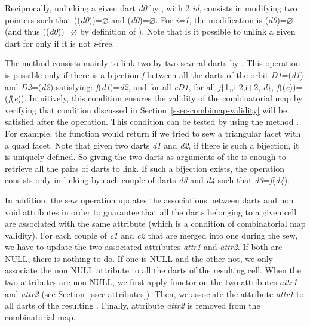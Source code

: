 Reciprocally, unlinking a given dart \emph{d0} by \betai{}, with 2\myleq{}
\emph{i}\myleq{}\emph{d}, consists in modifying two \betai{} pointers
such that \betai{}(\betai{}(\emph{d0}))=$\varnothing$ and
\betai{}(\emph{d0})=$\varnothing$.  For \emph{i=1}, the modification is
\betaun{}(\emph{d0})=$\varnothing$ (and thus
\betazero{}(\betaun{}(\emph{d0}))=$\varnothing$ by definition of \betazero{}).  Note
that is it possible to unlink a given dart for \betai{} only if it is
not \emph{i}-free.

The  method consists mainly to link two by two
several darts by \betai{}. This operation is possible only if there is
a bijection \emph{f} between all the darts of the orbit
\emph{D1}=\orbit{\betaun{},\myldots{},\betaimdeux{},\betaipdeux{},\myldots{},\betad{}}(\emph{d1}) and
\emph{D2}=\orbit{\betaun{},\myldots{},\betaimdeux{},\betaipdeux{},\myldots{},\betad{}}(\emph{d2})
satisfying: \emph{f}(\emph{d1})=\emph{d2}, and for all \emph{e}\myin{}\emph{D1}, 
for all \emph{j}\myin{}\{1,\myldots{},i-2,i+2,\myldots{},\emph{d}\},
\emph{f}(\betaj{}(\emph{e}))=\betajinv{}(\emph{f}(\emph{e})).  Intuitively, this condition
ensures the validity of the combinatorial map by verifying that
condition discussed in Section~\ref{ssec-combimap-validity} will be
satisfied after the operation.  This condition can be tested by using the method
. For example, the function
 would return  if we tried to sew a
triangular facet with a quad facet. Note that given two darts \emph{d1}
and \emph{d2}, if there is such a bijection, it is uniquely defined. So giving
the two darts as arguments of the  is enough to retrieve
all the pairs of darts to link.
If such a bijection exists, the  operation
consists only in linking by \betai{} each couple of darts \emph{d3} and
\emph{d4} such that \emph{d3}=\emph{f}(\emph{d4}).

In addition, the sew operation updates the associations between darts
and non void attributes in order to guarantee that all the darts
belonging to a given cell are associated with the same attribute
(which is a condition of combinatorial map validity).  For each couple
of  \emph{c1} and \emph{c2} that are merged into one  during
the sew, we have to update the two associated attributes \emph{attr1} and
\emph{attr2}.  If both are NULL, there is nothing to do.  If one is NULL
and the other not, we only associate the non NULL attribute to all the
darts of the resulting cell.  When the two attributes are non NULL, we
first apply functor  on the two attributes \emph{attr1} and
\emph{attr2} (see Section~\ref{ssec-attributes}). Then, we associate the
attribute \emph{attr1} to all darts of the resulting . Finally,
attribute \emph{attr2} is removed from the combinatorial map. 

